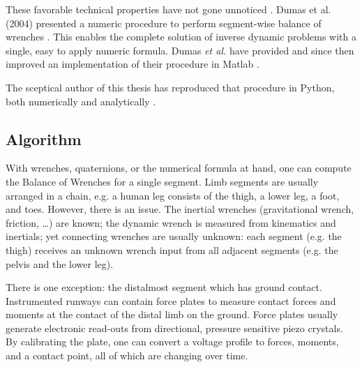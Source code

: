 These favorable technical properties have not gone unnoticed \citep{Dumas2004,Dumas2007}.
Dumas et al. (2004) presented a numeric procedure to perform segment-wise balance of wrenches \citep[equation 15 in][]{Dumas2004}.
This enables the complete solution of inverse dynamic problems with a single, easy to apply numeric formula.
Dumas \emph{et al.} have provided and since then improved an implementation of their procedure in Matlab \citep{DumasMatlab}.


The sceptical author of this thesis has reproduced that procedure in Python, both numerically and analytically \citep{Mielke2021id}.


\subsection{Algorithm}
\label{sec:orgffe3948}
With wrenches, quaternions, or the numerical formula at hand, one can compute the Balance of Wrenches for a single segment.
Limb segments are usually arranged in a chain, e.g. a human leg consists of the thigh, a lower leg, a foot, and toes.
However, there is an issue.
The inertial wrenches (gravitational wrench, friction, \ldots{}) are known; the dynamic wrench is measured from kinematics and inertials; yet connecting wrenches are usually unknown: each segment (e.g. the thigh) receives an unknown wrench input from all adjacent segments (e.g. the pelvis and the lower leg).

There is one exception: the distalmost segment which has ground contact.
Instrumented runways can contain force plates to measure contact forces and moments at the contact of the distal limb on the ground.
Force plates usually generate electronic read-outs from directional, pressure sensitive piezo crystals.
By calibrating the plate, one can convert a voltage profile to forces, moments, and a contact point, all of which are changing over time.


